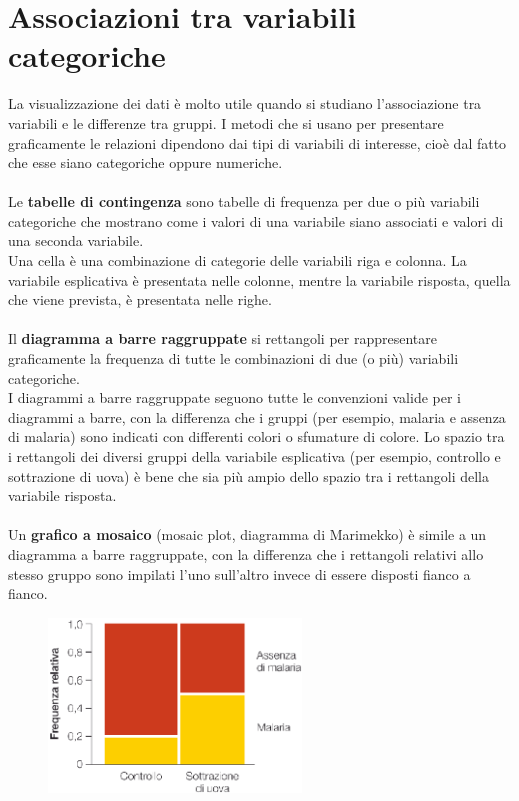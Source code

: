 \documentclass[10pt, draft]{book}
\begin{document}
\section{Associazioni tra variabili categoriche}
La visualizzazione dei dati è molto utile quando si studiano l'associazione tra variabili e le differenze tra gruppi. I metodi che si usano per presentare graficamente le relazioni dipendono dai tipi di variabili di interesse, cioè dal fatto che esse siano categoriche oppure numeriche.
\\
\\
Le \textbf{tabelle di contingenza} sono tabelle di frequenza per due o più variabili categoriche che mostrano come i valori di una variabile siano associati e valori di una seconda variabile. 
\\
Una cella è una combinazione di categorie delle variabili riga e colonna. La variabile esplicativa è presentata nelle colonne, mentre la variabile risposta, quella che viene prevista, è presentata nelle righe. 
\\
\\
Il \textbf{diagramma a barre raggruppate} si rettangoli per rappresentare graficamente la frequenza di tutte le combinazioni di due (o più) variabili categoriche.
\\
I diagrammi a barre raggruppate seguono tutte le convenzioni valide per i diagrammi a barre, con la differenza che i gruppi (per esempio, malaria e assenza di malaria) sono indicati con differenti colori o sfumature di colore.  Lo spazio tra i rettangoli dei diversi gruppi della variabile esplicativa (per esempio, controllo e sottrazione di uova) è bene che sia più ampio dello spazio tra i rettangoli della variabile risposta.
\\
\\
Un \textbf{grafico a mosaico} (mosaic plot, diagramma di Marimekko) è simile a un diagramma a barre raggruppate, con la differenza che i rettangoli relativi allo stesso gruppo sono impilati l'uno sull'altro invece di essere disposti fianco a fianco.
\\
    \begin{figure}[h]\label{fig2.3-2}
    \centering
    \includegraphics[width=0.6\textwidth]{fig2.3-2}
    \caption{\small{}}
    \end{figure}
\end{document}
